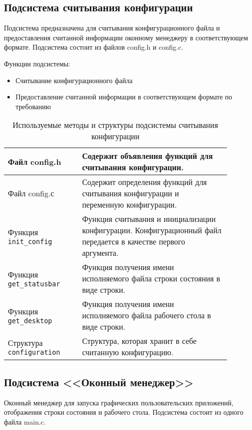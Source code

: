 \documentclass[10pt,a4paper]{report}
\begin{document}
\subsection{Подсистема считывания конфигурации}
Подсистема предназначена для считывания конфигурационного файла и предоставления считанной информации оконному менеджеру в соответствующем формате. Подсистема состоит из файлов config.h и config.c.
			
Функции подсистемы:
\begin{itemize}
\item Считывание конфигурационного файла
\item Предоставление считанной информации в соответствующем формате по требованию
\end{itemize}
			
\begin{table}[H]
\caption{Используемые методы и структуры подсистемы считывания конфигурации}
\label{tabular:configSystem}
\begin{center}
\begin{tabular}{| p{0.3\linewidth} | p{0.6\linewidth} |}
\hline
Файл config.h & Содержит объявления функций для считывания конфигурации.\\
\hline
Файл config.с & Содержит определения функций для считывания конфигурации и переменную конфигурации.\\
\hline
Функция \texttt{init\_config} & Функция считывания и инициализации конфигурации. Конфигурационный файл передается в качестве первого аргумента. \\
\hline
Функция \texttt{get\_statusbar} & Функция получения имени исполняемого файла строки состояния в виде строки.\\
\hline
Функция \texttt{get\_desktop} & Функция получения имени исполняемого файла рабочего стола в виде строки.\\
\hline
Структура \texttt{configuration} & Структура, которая хранит в себе считанную конфигурацию.\\
\hline
\end{tabular}
\end{center}
\end{table}
			
\subsection{Подсистема <<Оконный менеджер>>}
Оконный менеджер для запуска графических пользовательских приложений, отображения строки состояния и рабочего стола. Подсистема состоит из одного файла main.c.
		
\end{document}
